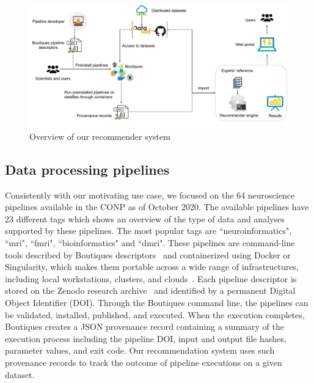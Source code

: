 %   


\begin{figure}[ht]
  \centering
  \includegraphics[width=\textwidth]{figures/Methodology.pdf}%
  \caption{Overview of our recommender system}
  \label{fig:method}
  \end{figure}  


\subsection{Data processing pipelines} 
Consistently with our motivating use case, we focused on the 64
neuroscience pipelines available in the CONP as of October
2020. 
The available pipelines have 23 different tags which shows an overview of the type of data
and analyses supported by these pipelines. The most popular tags are ``neuroinformatics", ``mri", ``fmri", ``bioinformatics" and ``dmri". These pipelines are command-line
tools described by Boutiques descriptors~\cite{glatard2018boutiques} and
containerized using Docker or Singularity, which makes them portable across
a wide range of infrastructures, including local workstations, clusters,
and clouds~\cite{kiar2019serverless}. Each pipeline descriptor is stored on
the Zenodo research archive~\cite{https://doi.org/10.25495/7gxk-rd71} and identified by a permanent Digital Object
Identifier (DOI). Through the Boutiques command line, the pipelines can be
validated, installed, published, and executed. When the execution
completes, Boutiques creates a JSON provenance record containing a summary
of the execution process including the pipeline DOI, input and output file
hashes, parameter values, and exit code. Our recommendation system uses
such provenance records to track the outcome of pipeline executions on a
given dataset.



